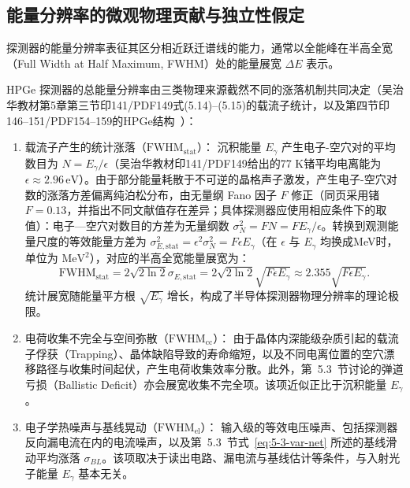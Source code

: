 \subsection{能量分辨率的微观物理贡献与独立性假定}\label{subsec:5-2-3}

探测器的能量分辨率表征其区分相近跃迁谱线的能力，通常以全能峰在半高全宽（Full Width at Half Maximum, FWHM）处的能量展宽 $\Delta E$ 表示。

HPGe 探测器的总能量分辨率由三类物理来源截然不同的涨落机制共同决定（吴治华教材第5章第三节印141/PDF149式(5.14)–(5.15)的载流子统计，以及第四节印146–151/PDF154–159的HPGe结构~\cite{book-wu-nuclear-experiment-methods}）：
\begin{enumerate}
\item 载流子产生的统计涨落（$\mathrm{FWHM}_{\mathrm{stat}}$）：
沉积能量 $E_\gamma$ 产生电子-空穴对的平均数目为 $N = E_\gamma / \epsilon$（吴治华教材印141/PDF149给出的77 K锗平均电离能为 $\epsilon \approx 2.96\,\text{eV}$）。由于部分能量耗散于不可逆的晶格声子激发，产生电子-空穴对数的涨落方差偏离纯泊松分布，由无量纲 Fano 因子 $F$ 修正（同页采用锗 $F=0.13$，并指出不同文献值存在差异；具体探测器应使用相应条件下的取值）：电子—空穴对数目的方差为无量纲数 $\sigma_N^2 = F N = F E_\gamma / \epsilon$。转换到观测能量尺度的等效能量方差为 $\sigma_{E, \mathrm{stat}}^2 = \epsilon^2 \sigma_N^2 = F \epsilon E_\gamma$（在 $\epsilon$ 与 $E_\gamma$ 均换成MeV时，单位为 $\mathrm{MeV}^2$），对应的半高全宽能量展宽为：
\begin{equation}\label{eq:5-2-fwhm-stat}
\mathrm{FWHM}_{\mathrm{stat}} = 2\sqrt{2\ln 2} \sigma_{E, \mathrm{stat}} = 2\sqrt{2\ln 2} \sqrt{F \epsilon E_\gamma} \approx 2.355 \sqrt{F \epsilon E_\gamma}.
\end{equation}
统计展宽随能量平方根 $\sqrt{E_\gamma}$ 增长，构成了半导体探测器物理分辨率的理论极限。
\item 电荷收集不完全与空间弥散（$\mathrm{FWHM}_{\mathrm{cc}}$）：
由于晶体内深能级杂质引起的载流子俘获（Trapping）、晶体缺陷导致的寿命缩短，以及不同电离位置的空穴漂移路径与收集时间起伏，产生电荷收集效率分散。此外，第~5.3~节讨论的弹道亏损（Ballistic Deficit）亦会展宽收集不完全项。该项近似正比于沉积能量 $E_\gamma$。
\item 电子学热噪声与基线晃动（$\mathrm{FWHM}_{\mathrm{el}}$）：
输入级的等效电压噪声、包括探测器反向漏电流在内的电流噪声，以及第~5.3~节式~\eqref{eq:5-3-var-net} 所述的基线滑动平均涨落 $\sigma_{BL}$。该项取决于读出电路、漏电流与基线估计等条件，与入射光子能量 $E_\gamma$ 基本无关。
\end{enumerate}

